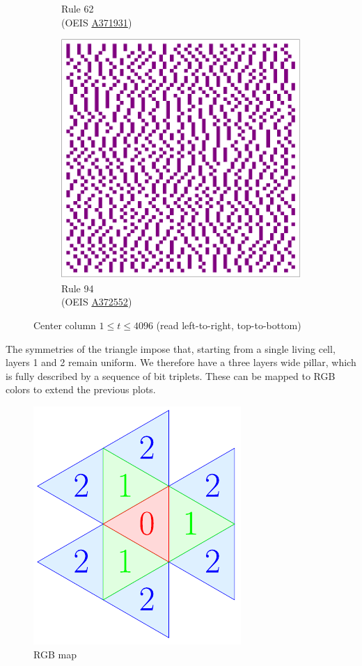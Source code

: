 \documentclass{article}
\begin{document}
\begin{figure}[H]
\begin{subfigure}[b]{0.24\textwidth}
        \caption*{Rule 62\\(OEIS \href{https://oeis.org/A371931}{A371931})}
        \label{fig:rule-62-center_column_plot-4096}
    \end{subfigure}
    \begin{subfigure}[b]{0.24\textwidth}
        \centering
        \includegraphics[width=.9\textwidth]{graphics/behavior/center-columns/rule-94-center_column_plot-4096.pdf}
        \caption*{Rule 94\\(OEIS \href{https://oeis.org/A372552}{A372552})}
        \label{fig:rule-94-center_column_plot-4096}
    \end{subfigure}
       \caption{Center column $1\leq t \leq 4096$ (read left-to-right, top-to-bottom)}
       \label{fig:center-column}
\end{figure}

The symmetries of the triangle impose that, starting from a single living cell, layers 1 and 2 remain uniform. We therefore have a three layers wide pillar, which is fully described by a sequence of bit triplets. These can be mapped to RGB colors to extend the previous plots.

\vspace{-8pt}

\begin{figure}[H]
    \centering
    \includegraphics[width=.2\textwidth]{graphics/behavior/center-columns/rgb-map.pdf}
    \caption{RGB map}
    \label{fig:rgb-map}
\end{figure}
\end{document}
